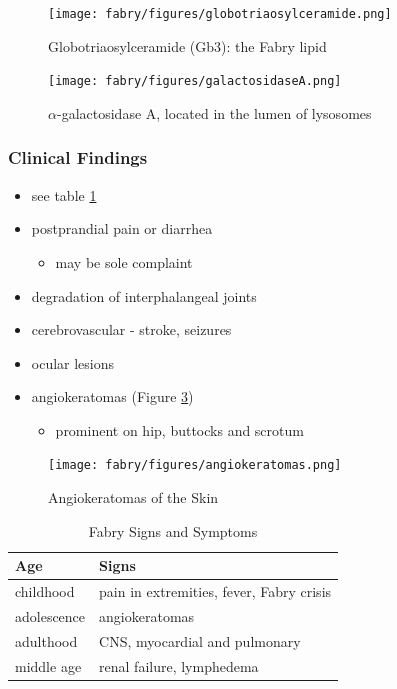 \documentclass[12pt]{scrartcl}
\begin{document}
\begin{figure}[htbp]
\centering
\texttt{[image: fabry/figures/globotriaosylceramide.png]}
\caption[Globotriaosylceramide]{\label{fig:org51887a5}Globotriaosylceramide (Gb3): the Fabry lipid}
\end{figure}

\begin{figure}[htbp]
\centering
\texttt{[image: fabry/figures/galactosidaseA.png]}
\caption[\(\alpha\)-galactosidase A]{\label{fig:org770005d}\(\alpha\)-galactosidase A, located in the lumen of lysosomes}
\end{figure}


\subsubsection{Clinical Findings}
\label{sec:org6a679fb}
\begin{itemize}
\item see table \ref{tab:orgf3b5163}
\item postprandial pain or diarrhea
\begin{itemize}
\item may be sole complaint
\end{itemize}
\item degradation of interphalangeal joints
\item cerebrovascular - stroke, seizures
\item ocular lesions
\item angiokeratomas (Figure \ref{fig:orge297283})
\begin{itemize}
\item prominent on hip, buttocks and scrotum
\end{itemize}
\end{itemize}

\begin{figure}[htbp]
\centering
\texttt{[image: fabry/figures/angiokeratomas.png]}
\caption[Angiokeratomas of the skin]{\label{fig:orge297283}Angiokeratomas of the Skin}
\end{figure}

\begin{table}[htbp]
\caption{\label{tab:orgf3b5163}Fabry Signs and Symptoms}
\centering
\begin{tabular}{ll}
Age & Signs\\
\hline
childhood & pain in extremities, fever, Fabry crisis \footnotemark\\
adolescence & angiokeratomas\\
adulthood & CNS, myocardial and pulmonary\\
middle age & renal failure, lymphedema\\
\end{tabular}
\end{table}
\end{document}
